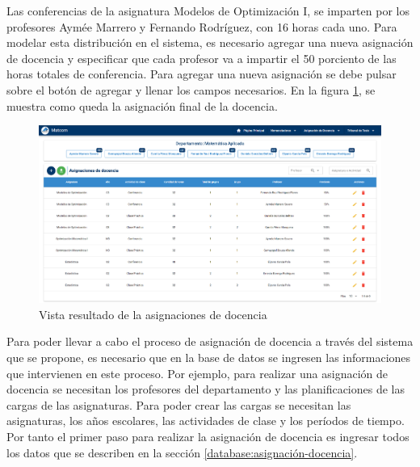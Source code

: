 Las conferencias de la asignatura Modelos de Optimización I, se imparten por los profesores 
Aymée Marrero y Fernando Rodríguez, con 16 horas cada uno.
Para modelar esta distribución en el sistema, es necesario agregar una 
nueva asignación de docencia y especificar que cada profesor va a impartir el 50 porciento 
de las horas totales de conferencia. Para agregar una nueva asignación se debe pulsar sobre el 
botón de agregar y llenar los campos necesarios. En la figura
\ref{img-ta-result}, se muestra como queda
la asignación final de la docencia. 

\begin{figure}[H]
    \includegraphics[scale=0.3]{Graphics/Implementation/Docencia/AD-result.png}
    \caption{Vista resultado de la asignaciones de docencia}
    \label{img-ta-result}
\end{figure}


Para poder llevar a cabo el proceso de asignación de docencia a través del sistema 
que se propone, es necesario que en la base de datos se ingresen las informaciones 
que intervienen en este proceso. Por ejemplo, para realizar una asignación de docencia se necesitan 
los profesores del departamento
y las planificaciones de las cargas de las asignaturas. Para poder crear las cargas  
se necesitan las asignaturas, los años escolares, las actividades de clase y los períodos de tiempo.
Por tanto el primer paso para realizar la asignación de docencia es ingresar todos los datos que 
se describen en la sección \ref{database:asignación-docencia}.









